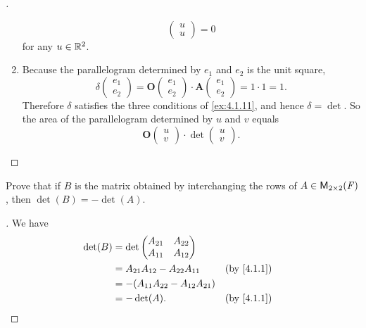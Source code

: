 \begin{proof}[]
\begin{enumerate}
\[\begin{pmatrix}
              u \\
              u
            \end{pmatrix} = 0
          \]
          for any \(u \in \mathbb{R}^2\).
    \item Because the parallelogram determined by \(e_1\) and \(e_2\) is the unit square,
          \[
            \delta\begin{pmatrix}
              e_1 \\
              e_2
            \end{pmatrix} = \mathbf{O}\begin{pmatrix}
              e_1 \\
              e_2
            \end{pmatrix} \cdot \mathbf{A}\begin{pmatrix}
              e_1 \\
              e_2
            \end{pmatrix} = 1 \cdot 1 = 1.
          \]
          Therefore \(\delta\) satisfies the three conditions of \cref{ex:4.1.11}, and hence \(\delta = \det\).
          So the area of the parallelogram determined by \(u\) and \(v\) equals
          \[
            \mathbf{O}\begin{pmatrix}
              u \\
              v
            \end{pmatrix} \cdot \det\begin{pmatrix}
              u \\
              v
            \end{pmatrix}.
          \]
  \end{enumerate}
\end{proof}

\exercisesection

\setcounter{ex}{4}
\begin{ex}\label{ex:4.1.5}
  Prove that if \(B\) is the matrix obtained by interchanging the rows of \(A \in \ms[2][2][\F]\), then \(\det(B) = -\det(A)\).
\end{ex}

\begin{proof}[]
  We have
  \begin{align*}
    \det(B) & = \det\begin{pmatrix}
                      A_{2 1} & A_{2 2} \\
                      A_{1 1} & A_{1 2}
                    \end{pmatrix}                                \\
            & = A_{2 1} A_{1 2} - A_{2 2} A_{1 1}    &  & \by{4.1.1} \\
            & = -(A_{1 1} A_{2 2} - A_{1 2} A_{2 1})                 \\
            & = -\det(A).                            &  & \by{4.1.1}
  \end{align*}
\end{proof}

